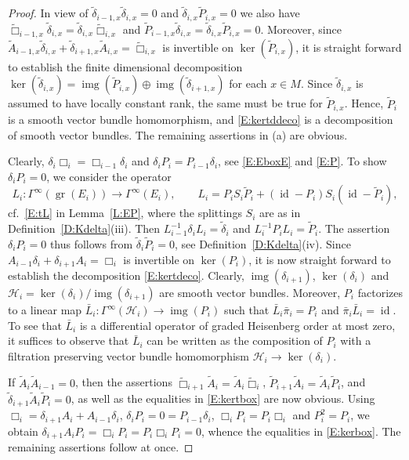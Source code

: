 \documentclass[reqno,12pt]{amsart}
\DeclareMathOperator{\img}{img}
\DeclareMathOperator{\gr}{gr}
\DeclareMathOperator{\id}{id}
\theoremstyle{plain}
\theoremstyle{definition}
\begin{document}
\begin{proof}
In view of $\tilde\delta_{i-1,x}\tilde\delta_{i,x}=0$ and $\tilde\delta_{i,x}\tilde P_{i,x}=0$ we also have $\tilde\Box_{i-1,x}\tilde\delta_{i,x}=\tilde\delta_{i,x}\tilde\Box_{i,x}$ and $\tilde P_{i-1,x}\tilde\delta_{i,x}=\tilde\delta_{i,x}\tilde P_{i,x}=0$.
Moreover, since $\tilde A_{i-1,x}\tilde\delta_{i,x}+\tilde\delta_{i+1,x}\tilde A_{i,x}=\tilde\Box_{i,x}$ is invertible on $\ker(\tilde P_{i,x})$, it is straight forward to establish the finite dimensional decomposition $\ker(\tilde\delta_{i,x})=\img(\tilde P_{i,x})\oplus\img(\tilde\delta_{i+1,x})$ for each $x\in M$.
Since $\tilde\delta_{i,x}$ is assumed to have locally constant rank, the same must be true for $\tilde P_{i,x}$.
Hence, $\tilde P_i$ is a smooth vector bundle homomorphism, and \eqref{E:kertddeco} is a decomposition of smooth vector bundles.
The remaining assertions in (a) are obvious.


Clearly, $\delta_i\Box_i=\Box_{i-1}\delta_i$ and $\delta_iP_i=P_{i-1}\delta_i$, see \eqref{E:EboxE} and \eqref{E:P}.
To show $\delta_iP_i=0$, we consider the operator 
\begin{equation}\label{E:Li4}
L_i\colon\Gamma^\infty(\gr(E_i))\to\Gamma^\infty(E_i),\qquad
L_i=P_iS_i\tilde P_i+(\id-P_i)S_i(\id-\tilde P_i),
\end{equation}
cf.~\eqref{E:tL} in Lemma~\ref{L:EP}, where the splittings $S_i$ are as in Definition~\ref{D:Kdelta}(iii).
Then $L_{i-1}^{-1}\delta_iL_i=\tilde\delta_i$ and $L^{-1}_iP_iL_i=\tilde P_i$.
The assertion $\delta_iP_i=0$ thus follows from $\tilde\delta_i\tilde P_i=0$, see Definition~\ref{D:Kdelta}(iv).
Since $A_{i-1}\delta_i+\delta_{i+1}A_i=\Box_i$ is invertible on $\ker(P_i)$, it is now straight forward to establish the decomposition \eqref{E:kertdeco}.
Clearly, $\img(\delta_{i+1})$, $\ker(\delta_i)$ and $\mathcal H_i=\ker(\delta_i)/\img(\delta_{i+1})$ are smooth vector bundles.
Moreover, $P_i$ factorizes to a linear map $\bar L_i\colon\Gamma^\infty(\mathcal H_i)\to\img(P_i)$ such that $\bar L_i\bar\pi_i=P_i$ and $\bar\pi_i\bar L_i=\id$.
To see that $\bar L_i$ is a differential operator of graded Heisenberg order at most zero, it suffices to observe that $\bar L_i$ can be written as the composition of $P_i$ with a filtration preserving vector bundle homomorphism $\mathcal H_i\to\ker(\delta_i)$.


If $\tilde A_i\tilde A_{i-1}=0$, then the assertions $\tilde\Box_{i+1}\tilde A_i=\tilde A_i\tilde\Box_i$, $\tilde P_{i+1}\tilde A_i=\tilde A_i\tilde P_i$, and $\tilde\delta_{i+1}\tilde A_i\tilde P_i=0$, as well as the equalities in \eqref{E:kertbox} are now obvious.
Using $\Box_i=\delta_{i+1}A_i+A_{i-1}\delta_i$, $\delta_iP_i=0=P_{i-1}\delta_i$, $\Box_iP_i=P_i\Box_i$ and $P^2_i=P_i$, we obtain $\delta_{i+1}A_iP_i=\Box_iP_i=P_i\Box_iP_i=0$, whence the equalities in \eqref{E:kerbox}.
The remaining assertions follow at once.
\end{proof}
\end{document}
